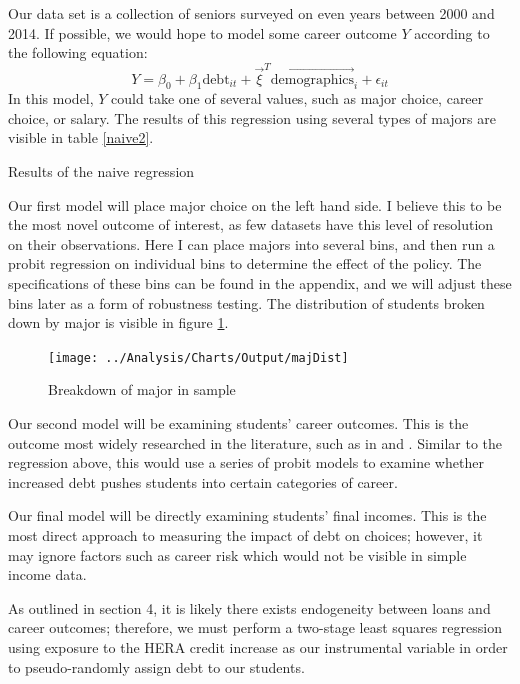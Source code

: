 \documentclass{article}
\newcommand{\regs}{../Analysis/Regressions/Output/}
\begin{document}
	Our data set is a collection of seniors surveyed on even years between 2000 and 2014. If possible, we would hope to model some career outcome $Y$ according to the following equation: $$Y = \beta_0 + \beta_1 \mbox{debt}_{it} + \vec{\xi}^T \vec{\mbox{demographics}}_i + \epsilon_{it}$$ In this model, $Y$ could take one of several values, such as major choice, career choice, or salary. The results of this regression using several types of majors are visible in table \ref{naive2}. 
	
	\begin{table}
		\centering
		\caption{Results of the naive regression}
		
		\label{naive2}
	\end{table}
	
	Our first model will place major choice on the left hand side. I believe this to be the most novel outcome of interest, as few datasets have this level of resolution on their observations. Here I can place majors into several bins, and then run a probit regression on individual bins to determine the effect of the policy. The specifications of these bins can be found in the appendix, and we will adjust these bins later as a form of robustness  testing. The distribution of students broken down by major is visible in figure \ref{majDist}.

	\begin{figure}
		\centering
		\caption{Breakdown of major in sample}
		\texttt{[image: ../Analysis/Charts/Output/majDist]}
		\label{majDist}
	\end{figure}
	
	Our second model will be examining students' career outcomes. This is the outcome most widely researched in the literature, such as in \textcite{rothstein2011} and \textcite{field2009}. Similar to the regression above, this would use a series of probit models to examine whether increased debt pushes students into certain categories of career.
	
	Our final model will be directly examining students' final incomes. This is the most direct approach to measuring the impact of debt on choices; however, it may ignore factors such as career risk which would not be visible in simple income data.
	
	As outlined in section 4, it is likely there exists endogeneity between loans and career outcomes; therefore, we must perform a two-stage least squares regression using exposure to the HERA credit increase as our instrumental variable in order to pseudo-randomly assign debt to our students. 
	
\end{document}
